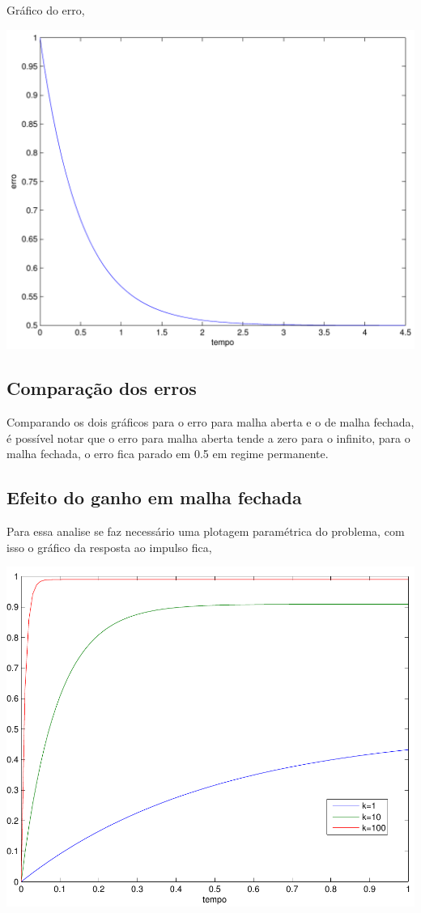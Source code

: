 \documentclass[paper=a4, fontsize=11pt]{article}
\begin{document}
Gráfico do erro,

\begin{center}
    \includegraphics[scale=0.5]{q7iberro.pdf}
\end{center}

\subsection{Comparação dos erros}

Comparando os dois gráficos para o erro para malha aberta e o de malha fechada, é possível
notar que o erro para malha aberta tende a zero para o infinito, para o malha fechada, o erro
fica parado em 0.5 em regime permanente.

\subsection{Efeito do ganho em malha fechada}

Para essa analise se faz necessário uma plotagem paramétrica do problema, com isso o gráfico
da resposta ao impulso fica,

\begin{center}
    \includegraphics[scale=0.5]{q7ic.pdf}
\end{center}
\end{document}
